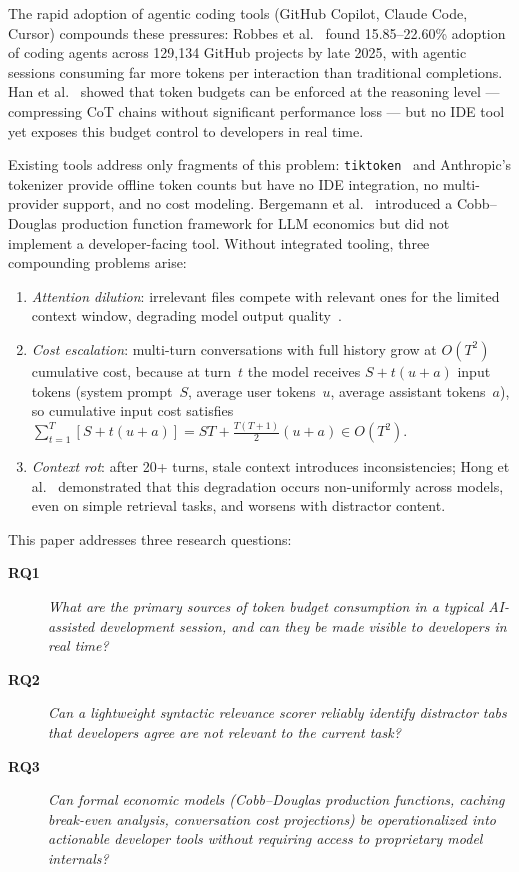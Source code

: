 \documentclass[a4paper,fleqn]{cas-dc}
\begin{document}
The rapid adoption of agentic coding tools (GitHub Copilot, Claude Code, Cursor) compounds these pressures: Robbes et al.~\cite{robbes2026agentic} found 15.85–22.60\% adoption of coding agents across 129,134 GitHub projects by late 2025, with agentic sessions consuming far more tokens per interaction than traditional completions. Han et al.~\cite{han2024talebudget} showed that token budgets can be enforced at the reasoning level — compressing CoT chains without significant performance loss — but no IDE tool yet exposes this budget control to developers in real time.

Existing tools address only fragments of this problem: \texttt{tiktoken}~\cite{sennrich2016bpe} and Anthropic's tokenizer provide offline token counts but have no IDE integration, no multi-provider support, and no cost modeling. Bergemann et al.~\cite{bergemann2025economics} introduced a Cobb–Douglas production function framework for LLM economics but did not implement a developer-facing tool. Without integrated tooling, three compounding problems arise:
\begin{enumerate}
  \item \textit{Attention dilution}: irrelevant files compete with relevant ones for the limited context window, degrading model output quality~\cite{bergemann2025economics,hong2025contextrot}.
  \item \textit{Cost escalation}: multi-turn conversations with full history grow at $O(T^2)$ cumulative cost, because at turn~$t$ the model receives $S + t(u + a)$ input tokens (system prompt~$S$, average user tokens~$u$, average assistant tokens~$a$), so cumulative input cost satisfies $\sum_{t=1}^{T}[S + t(u+a)] = ST + \tfrac{T(T+1)}{2}(u+a) \in O(T^2)$.
  \item \textit{Context rot}: after 20+ turns, stale context introduces inconsistencies; Hong et al.~\cite{hong2025contextrot} demonstrated that this degradation occurs non-uniformly across models, even on simple retrieval tasks, and worsens with distractor content.
\end{enumerate}

This paper addresses three research questions:\label{sec:intro_rqs}

\begin{description}
  \item[\textbf{RQ1}] \textit{What are the primary sources of token budget consumption in a typical AI-assisted development session, and can they be made visible to developers in real time?}
  \item[\textbf{RQ2}] \textit{Can a lightweight syntactic relevance scorer reliably identify distractor tabs that developers agree are not relevant to the current task?}
  \item[\textbf{RQ3}] \textit{Can formal economic models (Cobb–Douglas production functions, caching break-even analysis, conversation cost projections) be operationalized into actionable developer tools without requiring access to proprietary model internals?}
\end{description}
\end{document}
